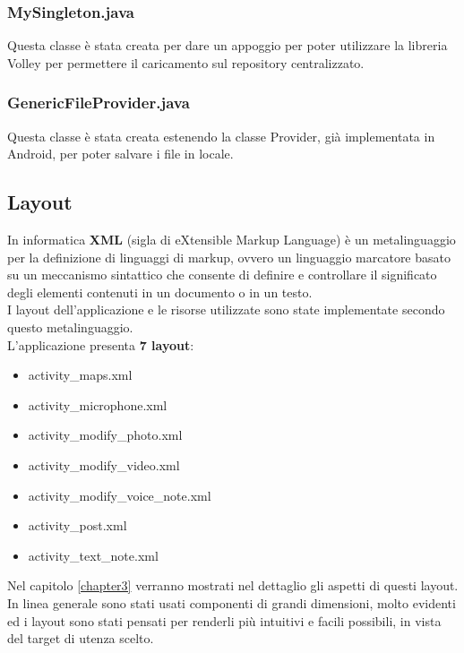\subsubsection{MySingleton.java}
Questa classe è stata creata per dare un appoggio per poter utilizzare la libreria Volley per permettere il caricamento sul repository centralizzato.
\subsubsection{GenericFileProvider.java}
Questa classe è stata creata estenendo la classe Provider, già implementata in Android, per poter salvare i file in locale.


\subsection{Layout}
\label{layout}
In informatica \textbf{XML} (sigla di eXtensible Markup Language) è un metalinguaggio per la definizione di linguaggi di markup, ovvero un linguaggio marcatore basato su un meccanismo sintattico che consente di definire e controllare il significato degli elementi contenuti in un documento o in un testo.\\
I layout dell'applicazione e le risorse utilizzate sono state implementate secondo questo metalinguaggio.\\
L'applicazione presenta \textbf{7 layout}:
\begin{itemize}
\item activity\_maps.xml
\item activity\_microphone.xml
\item activity\_modify\_photo.xml
\item activity\_modify\_video.xml
\item activity\_modify\_voice\_note.xml
\item activity\_post.xml
\item activity\_text\_note.xml
\end{itemize}
Nel capitolo \ref{chapter3} verranno mostrati nel dettaglio gli aspetti di questi layout.
\\In linea generale sono stati usati componenti di grandi dimensioni, molto evidenti ed i layout sono stati pensati per renderli più intuitivi e facili possibili, in vista del target di utenza scelto.


